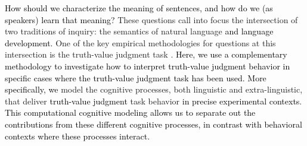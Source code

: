\documentclass[cm]{glossa}
\newcommand{\lsp}[1]{\textcolor{red}{[lsp: #1]}}
\newcommand{\lp}[1]{\textcolor{black}{#1}} %
\begin{document}
\lp{How should we characterize the meaning of sentences, and how do we (as speakers) learn that meaning?}
These questions call into focus the intersection of two traditions of inquiry: 
the semantics of natural language
\lp{and language development.}
One of the key empirical methodologies for questions at this intersection is the truth-value judgment 
task \citep{crainmckee1985,crainthornton1998}. 
\lp{Here, we}
\lp{use a complementary methodology to investigate}
\lp{how to interpret truth-value judgment behavior in specific cases where the truth-value judgment task has been used.}
\lp{More specifically, we}
model the cognitive processes, both linguistic and extra-linguistic, that deliver \lp{truth-value judgment} task behavior \lp{in precise experimental contexts}.
\lp{This computational cognitive modeling allows us to separate out the contributions from these different cognitive processes,
in contrast with 
behavioral contexts where these processes interact.}
\end{document}
